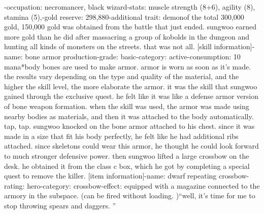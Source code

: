-occupation: necromancer, black wizard-stats: muscle strength (8+6), agility (8), stamina (5),-gold reserve: 298,880-additional trait: demonof the total 300,000 gold, 150,000 gold was obtained from the battle that just ended.
 sungwoo earned more gold than he did after massacring a group of kobolds in the dungeon and hunting all kinds of monsters on the streets.
 that was not all.
[skill information]-name: bone armor production-grade: basic-category: active-consumption: 10 mana*body bones are used to make armor.
 armor is worn as soon as it’s made.
 the results vary depending on the type and quality of the material, and the higher the skill level, the more elaborate the armor.
it was the skill that sungwoo gained through the exclusive quest.
 he felt like it was like a defense armor version of bone weapon formation.
 when the skill was used, the armor was made using nearby bodies as materials, and then it was attached to the body automatically.
tap, tap.
sungwoo knocked on the bone armor attached to his chest.
 since it was made in a size that fit his body perfectly, he felt like he had additional ribs attached.
 since skeletons could wear this armor, he thought he could look forward to much stronger defensive power.
then sungwoo lifted a large crossbow on the desk.
 he obtained it from the class c box, which he got by completing a special quest to remove the killer.
[item information]-name: dwarf repeating crossbow-rating: hero-category: crossbow-effect: equipped with a magazine connected to the armory in the subspace.
 (can be fired without loading.
)“well, it’s time for me to stop throwing spears and daggers.
”

 